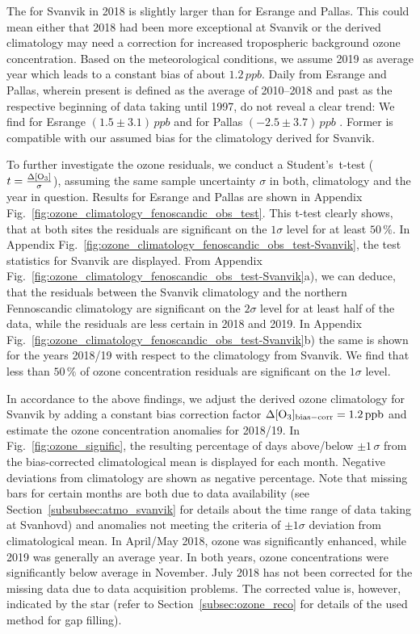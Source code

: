 \documentclass[bg, manuscript]{copernicus}
\begin{document}
The \chem{\left<\Delta\left<[O_3]\right>\right>} for Svanvik in 2018 is slightly larger than for Esrange and Pallas. This could mean either that 2018 had been more exceptional at Svanvik or the derived climatology may need a correction for increased tropospheric background ozone concentration. Based on the meteorological conditions, we assume 2019 as average year which leads to a constant bias of about $1.2\,\unit{ppb}$. Daily  from Esrange and Pallas, wherein present is defined as the average of 2010--2018 and past as the respective beginning of data taking until 1997, do not reveal a clear trend: We find for Esrange $(1.5\pm 3.1)\,\unit{ppb}$ and for Pallas $(-2.5\pm 3.7)\,\unit{ppb}$ \citep{NILU2003, BER:Ruoho-Airola2015}. Former is compatible with our assumed bias for the climatology derived for Svanvik.

To further investigate the ozone residuals, we conduct a Student's~t-test ($t = \frac{\chem{\Delta[O_3]}}{\sigma}$), assuming the same sample uncertainty $\sigma$ in both, climatology and the year in question. Results for Esrange and Pallas are shown in Appendix Fig.~\ref{fig:ozone_climatology_fenoscandic_obs_test}. This t-test clearly shows, that at both sites the residuals are significant on the $1\sigma$ level for at least $50\,\unit{\%}$. In Appendix Fig.~\ref{fig:ozone_climatology_fenoscandic_obs_test-Svanvik}, the test statistics for Svanvik are displayed. From Appendix Fig.~\ref{fig:ozone_climatology_fenoscandic_obs_test-Svanvik}a), we can deduce, that the residuals between the Svanvik climatology and the northern Fennoscandic climatology are significant on the $2\sigma$ level for at least half of the data, while the residuals are less certain in 2018 and 2019. In Appendix Fig.~\ref{fig:ozone_climatology_fenoscandic_obs_test-Svanvik}b) the same is shown for the years 2018/19 with respect to the climatology from Svanvik. We find that less than $50\,\unit{\%}$ of ozone concentration residuals are significant on the $1\sigma$ level.

In accordance to the above findings, we adjust the derived ozone climatology for Svanvik by adding a constant bias correction factor $\Delta\chem{[O_3]_\mathrm{bias-corr}} = 1.2\,\unit{ppb}$ and estimate the ozone concentration anomalies for 2018/19. In Fig.~\ref{fig:ozone_signific}, the resulting percentage of days above/below $\pm 1\,\sigma$ from the bias-corrected climatological mean is displayed for each month. Negative deviations from climatology are shown as negative percentage. Note that missing bars for certain months are both due to data availability (see Section~\ref{subsubsec:atmo_svanvik} for details about the time range of data taking at Svanhovd) and anomalies not meeting the criteria of $\pm 1\sigma$ deviation from climatological mean. In April/May 2018, ozone was significantly enhanced, while 2019 was generally an average year. In both years, ozone concentrations were significantly below average in November. July 2018 has not been corrected for the missing data due to data acquisition problems. The corrected value is, however, indicated by the star (refer to Section~\ref{subsec:ozone_reco} for details of the used method for gap filling).
\end{document}
